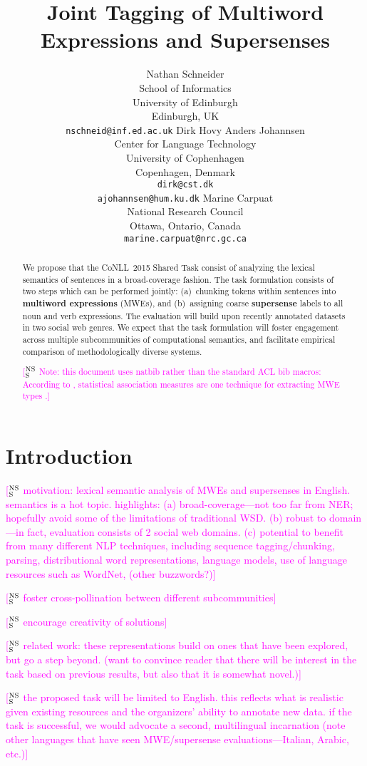 \documentclass[11pt]{article}
\title{Joint Tagging of Multiword Expressions and Supersenses}
\author{
Nathan Schneider \\
		School of Informatics\\
	   	University of Edinburgh\\
	    Edinburgh, UK\\
	    {\tt nschneid@inf.ed.ac.uk} \And
Dirk Hovy \quad Anders Johannsen\\
Center for Language Technology\\
University of Cophenhagen\\
Copenhagen, Denmark\\
{\tt dirk@cst.dk}\\ {\tt ajohannsen@hum.ku.dk} \And
Marine Carpuat\\
National Research Council\\
Ottawa, Ontario, Canada\\
{\tt marine.carpuat@nrc.gc.ca}}
\date{}
\newcommand{\ensuretext}[1]{#1}
\newcommand{\nssmarker}{\ensuretext{\textcolor{magenta}{\ensuremath{^{\textsc{NS}}_{\textsc{S}}}}}}
\newcommand{\arkcomment}[3]{\ensuretext{\textcolor{#3}{[#1 #2]}}}
\newcommand{\nss}[1]{\arkcomment{\nssmarker}{#1}{magenta}}
\begin{document}
\maketitle
\begin{abstract}
We propose that the CoNLL~2015 Shared Task 
consist of analyzing the lexical semantics of sentences 
in a broad-coverage fashion. 
The task formulation consists of two steps which can be performed jointly:
(a)~chunking tokens within sentences into \textbf{multiword expressions} (MWEs), and 
(b)~assigning coarse \textbf{supersense} labels to all noun and verb expressions. 
The evaluation will build upon recently annotated datasets in two social web genres.
We expect that the task formulation will foster engagement across 
multiple subcommunities of computational semantics, 
and facilitate empirical comparison of methodologically diverse systems.

\nss{Note: this document uses natbib rather than the standard ACL bib macros: 
According to \citet{baldwin-10}, statistical association measures 
are one technique for extracting MWE types \citep[cf.][\emph{inter alia}]{pecina-10}.}
\end{abstract}

\section{Introduction}

\nss{motivation: lexical semantic analysis of MWEs and supersenses in English. 
semantics is a hot topic.
highlights: (a) broad-coverage---not too far from NER; hopefully avoid some of the limitations of traditional WSD. 
(b) robust to domain---in fact, evaluation consists of 2 social web domains.
(c) potential to benefit from many different NLP techniques, including sequence tagging/chunking, 
parsing, distributional word representations, language models, 
use of language resources such as WordNet, (other buzzwords?)}

\nss{foster cross-pollination between different subcommunities}

\nss{encourage creativity of solutions}

\nss{related work: these representations build on ones that have been explored, 
but go a step beyond. (want to convince reader that there will be interest in the task based on previous results, 
but also that it is somewhat novel.)}

\nss{the proposed task will be limited to English. 
this reflects what is realistic given existing resources and the organizers' ability to annotate new data. 
if the task is successful, we would advocate a second, multilingual incarnation 
(note other languages that have seen MWE/supersense evaluations---Italian, Arabic, etc.)}
\end{document}
